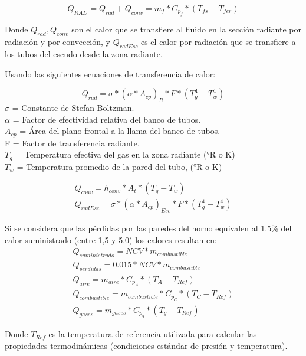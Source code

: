 \begin{equation}
    \label{eq:rad-fluid}
    Q_{RAD} = Q_{rad} + Q_{conv} = m_f * C_{p_f} * (T_{fs} - T_{fer})
\end{equation}

\par Donde $Q_{rad}, Q_{conv}$ son el calor que se transfiere al fluido en la sección radiante por radiación y por convección, y $Q_{radEsc}$ es el calor por radiación que se transfiere a los tubos del escudo desde la zona radiante.

\par Usando las siguientes ecuaciones de transferencia de calor:

\begin{equation}
    Q_{rad} = \sigma * ( \alpha * A_{cp} )_{R} * F * ( T_{g}^{4} - T_{w}^{4} )
\end{equation}
$\sigma$ = Constante de Stefan-Boltzman.\\
$\alpha$ = Factor de efectividad relativa del banco de tubos.\\
$A_{cp}$ = Área del plano frontal a la llama del banco de tubos.\\
F = Factor de transferencia radiante.\\
$T_g$ = Temperatura efectiva del gas en la zona radiante (°R o K)\\
$T_w$ = Temperatura promedio de la pared del tubo, (°R o K)

\begin{gather}
    Q_{conv} = h_{conv} * A_t * (T_g - T_w)\\
    Q_{radEsc} = \sigma * ( \alpha * A_{cp} )_{Esc} * F * ( T_{g}^{4} - T_{w}^{4} )
\end{gather}

\par Si se considera que las pérdidas por las paredes del horno equivalen al 1.5\% del calor suministrado (entre 1,5 y 5.0) los calores resultan en:
\begin{gather}
    Q_{suministrado} = NCV * m_{combustible}\\
    Q_{perdidas} = 0.015 * NCV * m_{combustible}\\
    Q_{aire} = m_{aire} * C_{p_A} * (T_A - T_{Ref})\\
    Q_{combustible} = m_{combustible} * C_{p_C} * (T_C - T_{Ref})\\
    Q_{gases} = m_{gases} * C_{p_g} * (T_g - T_{Ref})
\end{gather}

\par Donde $T_{Ref}$ es la temperatura de referencia utilizada para calcular las propiedades termodinámicas (condiciones estándar de presión y temperatura).

